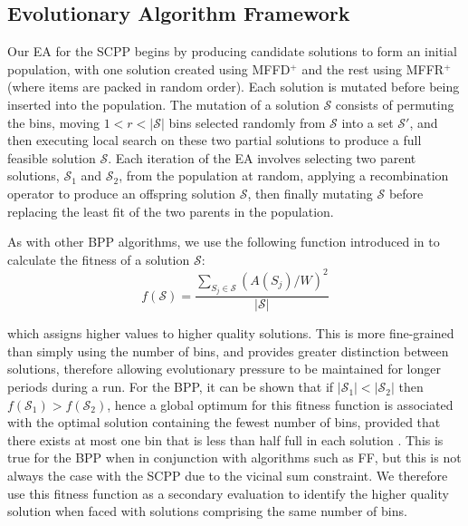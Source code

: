 \documentclass[a4paper,11pt,authoryear]{elsarticle}
\begin{document}
\subsection{Evolutionary Algorithm Framework}
\label{sub:eaframework}
\noindent Our EA for the SCPP begins by producing candidate solutions to form an initial population, with one solution created using MFFD$^+$ and the rest using MFFR$^+$ (where items are packed in random order). Each solution is mutated before being inserted into the population. The mutation of a solution $\mathcal{S}$ consists of permuting the bins, moving $1 < r < |\mathcal{S}|$ bins selected randomly from $\mathcal{S}$ into a set $\mathcal{S}'$, and then executing local search on these two partial solutions to produce a full feasible solution $\mathcal{S}$. Each iteration of the EA involves selecting two parent solutions, $\mathcal{S}_1$ and $\mathcal{S}_2$, from the population at random, applying a recombination operator to produce an offspring solution $\mathcal{S}$, then finally mutating $\mathcal{S}$ before replacing the least fit of the two parents in the population.

As with other BPP algorithms, we use the following function introduced in \cite{falkenauer1992} to calculate the fitness of a solution $\mathcal{S}$:
\begin{equation}
f(\mathcal{S}) = \frac{\sum_{S_j \in \mathcal{S}} (A(S_j)/W)^2}{|\mathcal{S}|}
\label{eqn:fitness}
\end{equation}

\noindent which assigns higher values to higher quality solutions. This is more fine-grained than simply using the number of bins, and provides greater distinction between solutions, therefore allowing evolutionary pressure to be maintained for longer periods during a run. For the BPP, it can be shown that if $|\mathcal{S}_1| < |\mathcal{S}_2|$  then $f(\mathcal{S}_1) > f(\mathcal{S}_2)$, hence a global optimum for this fitness function is associated with the optimal solution containing the fewest number of bins, provided that there exists at most one bin that is less than half full in each solution \cite{falkenauer1998}. This is true for the BPP when in conjunction with algorithms such as FF, but this is not always the case with the SCPP due to the vicinal sum constraint. We therefore use this fitness function as a secondary evaluation to identify the higher quality solution when faced with solutions comprising the same number of bins.
\end{document}
